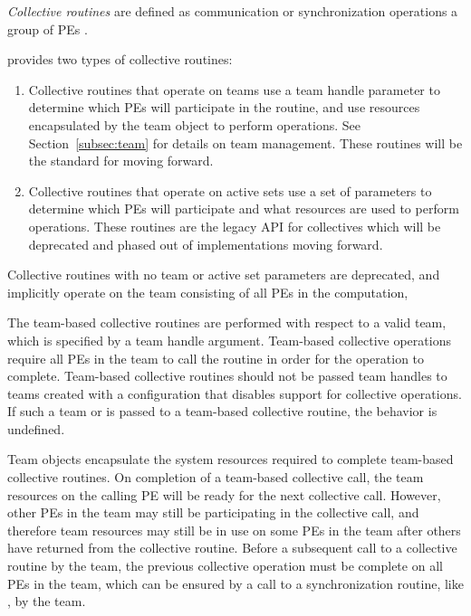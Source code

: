 \emph{Collective routines} are defined as  communication or synchronization
operations   a group of \acp{PE} .

{\color{Green}
\openshmem provides two types of collective routines:

\begin{enumerate}
\item Collective routines that operate on teams use a team handle parameter to determine
which \acp{PE} will participate in the routine, and use resources encapsulated by the team object
to perform operations. See Section~\ref{subsec:team} for details on team management.
These routines will be the standard for \openshmem moving forward.
\item Collective routines that operate on active sets use a set of parameters to determine
which \acp{PE} will participate and what resources are used to perform operations. These routines
are the legacy API for collectives which will be deprecated and phased out of
implementations moving forward.
\end{enumerate}

Collective routines with no team or active set parameters are deprecated,
and implicitly operate on the team consisting of all \acp{PE} in the computation,

The team-based collective routines are performed with respect to a valid
\openshmem team, which is specified by a team handle argument.
Team-based collective operations require all \acp{PE} in the team to call
the routine in order for the operation to complete. Team-based collective routines
should not be passed team handles to teams created with a configuration
that disables support for collective operations. If such a team
or  is passed to a team-based collective
routine, the behavior is undefined.

Team objects encapsulate the system resources required to complete team-based collective routines.
On completion of a team-based collective call, the team resources on the calling
\ac{PE} will be ready for the next collective call. However, other \acp{PE} in the
team may still be participating in the collective call, and therefore team
resources may still be in use on some \acp{PE} in the team after others have returned from
the collective routine. Before a subsequent call to a collective routine by the team,
the previous collective operation must be complete on all \acp{PE} in the team,
which can be ensured by a call to a synchronization routine, like ,
by the team.

}
